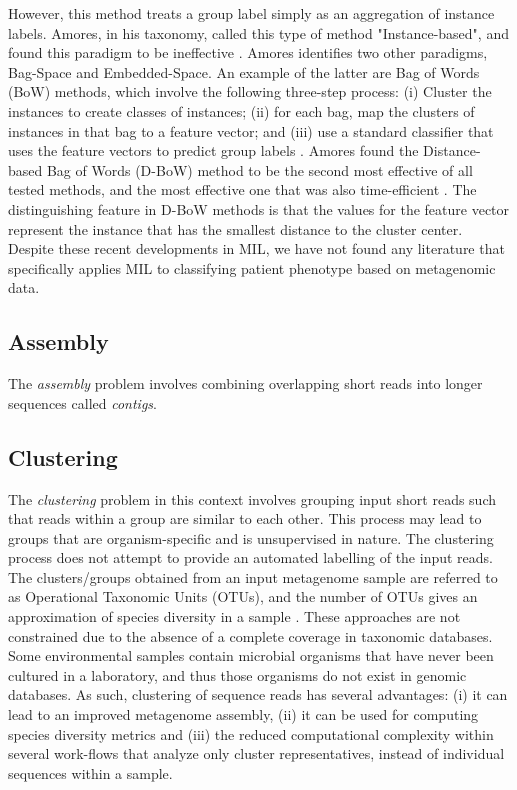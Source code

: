 However, this method treats a group label simply as an aggregation of instance labels. Amores, in his taxonomy, called this type of method "Instance-based", and found this paradigm to be ineffective \cite{amores13}. Amores identifies two other paradigms, Bag-Space and Embedded-Space. An example of the latter are Bag of Words (BoW) methods, which involve the following three-step process: (i) Cluster the instances to create classes of instances; (ii) for each bag, map the clusters of instances in that bag to a feature vector; and (iii) use a standard classifier that uses the feature vectors to predict group labels \cite{amores13}. Amores found the Distance-based Bag of Words (D-BoW) method to be the second most effective of all tested methods, and the most effective one that was also time-efficient \cite{amores13}. The distinguishing feature in D-BoW methods is that the values for the feature vector represent the instance that has the smallest distance to the cluster center. Despite these recent developments in MIL, we have not found any literature that specifically applies MIL to classifying patient phenotype based on metagenomic data.

\subsection{Assembly}

The \emph{assembly} problem involves combining overlapping short reads into longer sequences called \emph{contigs}.

\subsection{Clustering}

The \emph{clustering} problem in this context  involves grouping input short reads  such that reads within a group are 
similar to each other. This process may lead to groups that are organism-specific and is 
unsupervised in nature. 
%
The clustering process does not attempt to provide an automated labelling of the input reads. 
%
The clusters/groups obtained from an input metagenome sample 
are referred to as  Operational Taxonomic Units (OTUs), and the number of 
OTUs gives an approximation of species diversity in a sample \cite{schloss2009introducing,schloss2005introducing,sun2009esprit}.
%
These  approaches are not constrained due to the absence of a complete coverage in taxonomic databases. Some 
environmental samples contain microbial organisms that have never been cultured in a laboratory, and thus those organisms do not exist in genomic databases.
As such,  clustering of 
sequence reads has several advantages: (i)
        it can lead to an improved  metagenome assembly, (ii) it can be used 
        for computing species diversity metrics \cite{bibm2012} 
        and (iii)
        the  reduced computational
        complexity within several work-flows that analyze only
        cluster representatives, instead of individual sequences
        within a sample.

